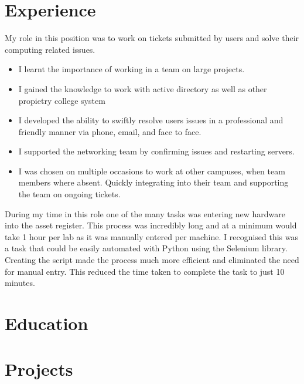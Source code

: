 \documentclass[a4paper]{cv}
\begin{document}
\hspace{0.2cm}
\begin{minipage}[t]{0.70\textwidth}
\section{Experience}
My role in this position was to work on tickets submitted by users and solve their computing related issues.
\begin{itemize}
    \item I learnt the importance of working in a team on large projects.
    \item I gained the knowledge to work with active directory as well as other propietry college system
    \item I developed the ability to swiftly resolve users issues in a professional and friendly manner via phone, email, and face to face.
    \item I supported the networking team by confirming issues and restarting servers.
    \item I was chosen on multiple occasions to work at other campuses, when team members where absent. Quickly integrating into their team and supporting the team on ongoing tickets.
\end{itemize}
During my time in this role one of the many tasks was entering new hardware into the asset register. This process was incredibly long and at a minimum would take 1 hour per lab as it was manually entered per machine. I recognised this was a task that could be easily automated with Python using the Selenium library. Creating the script made the process much more efficient and eliminated the need for manual entry. This reduced the time taken to complete the task to just 10 minutes.
\section{Education}
\sectionspace

\sectionspace

 
\section{Projects}

\end{minipage}
\end{document}
